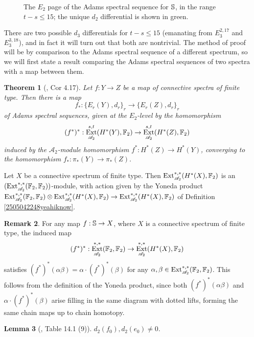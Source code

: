 \documentclass[11pt, titlepage]{article} %
\def\bb{\ensuremath\mathbb}
\def\A{\ensuremath{\mathscr{A}_2}}
\DeclareMathOperator{\Ext}{Ext}
\numberwithin{equation}{subsection}
\theoremstyle{plain}
\newtheorem{theorem}{Theorem}[subsection]
\newtheorem{lemma}[theorem]{Lemma}
\theoremstyle{definition}
\newtheorem{remark}[theorem]{Remark}
\begin{document}
\begin{figure}
\centering

\caption{The \(E_2\) page of the Adams spectral sequence for \(\bb{S}\), in the range \(t-s\leq 15\); the unique \(d_2\) differential is shown in green.}
\label{2504241227}
\end{figure}

There are two possible \(d_3\) differentials for \(t-s\leq 15\) (emanating from \(E_3^{2,17}\) and \(E_3^{3,18}\)), and in fact it will turn out that both are nontrivial. The method of proof will be by comparison to the Adams spectral sequence of a different spectrum, so we will first state a result comparing the Adams spectral sequences of two spectra with a map between them.

\begin{theorem}[{\autocite{ass}, Cor 4.17}]\label{2504141019}
Let \(f : Y \to Z\) be a map of connective spectra of finite type. Then there is a map
\[f_* : \{E_r(Y), d_r\}_r \to \{E_r(Z), d_r\}_r\]
of Adams spectral sequences, given at the \(E_2\)-level by the homomorphism
\[(f^*)^* : \Ext_{\A}^{s,t}(H^*(Y), \bb{F}_2) \to \Ext^{s,t}_{\A}(H^*(Z), \bb{F}_2)\]
induced by the \(\A\)-module homomorphism \(f^* : H^*(Z)\to H^*(Y)\), converging to the homomorphism \(f_* : \pi_*(Y) \to \pi_*(Z)\).
\end{theorem}

Let \(X\) be a connective spectrum of finite type. Then \(\Ext_{\A}^{*,*}(H^*(X), \bb{F}_2)\) is an \((\Ext_{\A}^{*,*}(\bb{F}_2, \bb{F}_2))\)-module, with action given by the Yoneda product \(\Ext_{\A}^{*,*}(\bb{F}_2, \bb{F}_2)\otimes \Ext_{\A}^{*,*}(H^*(X), \bb{F}_2)\to \Ext_{\A}^{*,*}(H^*(X), \bb{F}_2)\) of Definition \ref{2505042248yeahiknow}. 

\begin{remark}\label{2504211139}
For any map \(f : \bb{S}\to X\), where \(X\) is a connective spectrum of finite type, the induced map 
\[(f^*)^* : \Ext_{\A}^{*,*}(\bb{F}_2, \bb{F}_2)\to \Ext^{*,*}_{\A}(H^*(X), \bb{F}_2)\]
satisfies \((f^*)^*(\alpha \beta)=\alpha\cdot (f^*)^*(\beta)\) for any \(\alpha, \beta\in \Ext_{\A}^{*,*}(\bb{F}_2, \bb{F}_2)\). This follows from the definition of the Yoneda product, since  both \((f^*)^*(\alpha \beta)\) and \(\alpha\cdot(f^*)^*(\beta)\) arise filling in the same diagram with dotted lifts, forming the same chain maps up to chain homotopy. 
\end{remark}

\begin{lemma}[{\autocite{rognes2}, Table 14.1 (9)}]\label{2504192017}
\(d_2(f_0), d_2(e_0)\neq 0\).
\end{lemma}
\end{document}
